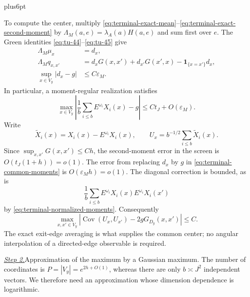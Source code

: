 \documentclass[12pt,reqno]{amsart}
\makeatletter
\theoremstyle{plain}
\theoremstyle{definition}
\theoremstyle{remark}
\renewenvironment{proof}[1][\proofname]{%
  \par
  \pushQED{\qed}%
  \normalfont
  \topsep6pt plus6pt\relax
  \trivlist
  \item[\hskip\labelsep\slshape #1\@addpunct{.}]%
  \ignorespaces
}{%
  \popQED
  \endtrivlist
  \@endpefalse
}
\DeclareRobustCommand{\qed}{%
  \leavevmode\unskip\penalty9999\hbox{}\nobreak
  \ifmmode
    \makebox[0pt][l]{\qquad\hbox{\qedsymbol}}%
  \else
    \qquad\hbox{\qedsymbol}%
  \fi
}
\renewcommand{\qedsymbol}{\rule[.47pt]{4pt}{6pt}}
\numberwithin{equation}{section}
\makeatother
\begin{document}
\begin{proof}
To compute the center, multiply
\eqref{eq:terminal-exact-mean}--\eqref{eq:terminal-exact-second-moment}
by $\Lambda_M(a,e)=\lambda_A(a)H(a,e)$ and sum first over $e$.
The Green identities \eqref{eq:tu-44}--\eqref{eq:tu-45} give
\begin{equation}
 \begin{split}
 \Lambda_M\mu_x&=d_x,\\
 \Lambda_Mq_{x,x'}
 &=d_xG(x,x')+d_{x'}G(x',x)-\mathbf1_{\{x=x'\}}d_x,\\
 \sup_{x\in V_y}|d_x-g|&\le C\varepsilon_M.
 \end{split}
 \label{eq:terminal-common-moments}
\end{equation}
In particular, a moment-regular realization satisfies
\begin{equation}
 \max_{x\in V_y}
 \left|\frac1b\sum_{i\le b}E^{\omega_i}X_i(x)-g\right|
 \le Ct_J+O(\varepsilon_M).
 \label{eq:terminal-conditional-mean}
\end{equation}
Write
\[
 \widetilde X_i(x)=X_i(x)-E^{\omega_i}X_i(x),\qquad
 U_x=b^{-1/2}\sum_{i\le b}\widetilde X_i(x).
\]
Since $\sup_{x,x'}G(x,x')\le Ch$, the second-moment error in the
screen is $O(t_J(1+h))=o(1)$.  The error from replacing $d_x$ by $g$
in \eqref{eq:terminal-common-moments} is $O(\varepsilon_Mh)=o(1)$.
The diagonal correction is bounded, as is
\[
 \frac1b\sum_{i\le b}
 E^{\omega_i}X_i(x)E^{\omega_i}X_i(x')
\]
by \eqref{eq:terminal-normalized-moments}.  Consequently
\begin{equation}
 \max_{x,x'\in V_y}
 \left|\operatorname{Cov}(U_x,U_{x'})-2gG_{D_y}(x,x')\right|
 \le C.
 \label{eq:terminal-covariance-comparison}
\end{equation}
The exact exit-edge averaging is what supplies the common center;
no angular interpolation of a directed-edge observable is required.

\smallskip\noindent
\underline{\textit{Step 2.}}\quad Approximation of the maximum by a Gaussian maximum.
The number of coordinates is $P=|V_y|=e^{2h+O(1)}$, whereas there
are only $b\asymp J^2$ independent vectors.  We therefore need an
approximation whose dimension dependence is logarithmic.


\end{proof}
\end{document}
